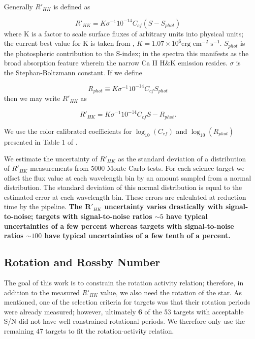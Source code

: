 Generally $R'_{HK}$ is defined as

\begin{equation}\label{eqn:RpHKDef}
    R'_{HK} = K\sigma^{-1}10^{-14}C_{cf}(S-S_{phot})
\end{equation}
where K is a factor to scale surface fluxes of arbitrary units into physical
units; the current best value for K is taken from \citet{Hal07},
$K=1.07\times10^{6}\text{erg cm$^{-2}$ s$^{-1}$}$. $S_{phot}$ is the
photospheric contribution to the S-index; in the spectra this manifests as the
broad absorption feature wherein the narrow Ca II H\&K emission resides.
$\sigma$ is the Stephan-Boltzmann constant. If we define 

\begin{equation}
    R_{phot}\equiv K\sigma^{-1}10^{-14}C_{cf}S_{phot}
\end{equation}
then we may write $R'_{HK}$ as 

\begin{equation}\label{eqn:RpHKFinal}
    R'_{HK} = K\sigma^{-1}10^{-14}C_{cf}S - R_{phot}.
\end{equation}

We use the color calibrated coefficients for $\log_{10}(C_{cf})$ and
$\log_{10}(R_{phot})$ presented in Table 1 of \citet{Def17}.

We estimate the uncertainty of $R'_{HK}$ as the standard deviation of a
distribution of $R'_{HK}$ measurements from 5000 Monte Carlo tests. For each
science target we offset the flux value at each wavelength bin by an amount
sampled from a normal distribution. The standard deviation of this normal
distribution is equal to the estimated error at each wavelength bin. These
errors are calculated at reduction time by the pipeline. \textbf{The R$'_{HK}$
uncertainty varies drastically with signal-to-noise; targets with
signal-to-noise ratios $\sim 5$ have typical uncertainties of a few percent
whereas targets with signal-to-noise ratios $\sim 100$ have typical
uncertainties of a few tenth of a percent.}

\subsection{Rotation and Rossby Number}
The goal of this work is to constrain the rotation activity relation;
therefore, in addition to the measured $R'_{HK}$ value, we also need the
rotation of the star. As mentioned, one of the selection criteria for targets
was that their rotation periods were already measured; however, ultimately
\textbf{6} of the 53 targets with acceptable S/N did not have well constrained
rotational periods. We therefore only use the remaining 47 targets to fit the
rotation-activity relation. 

